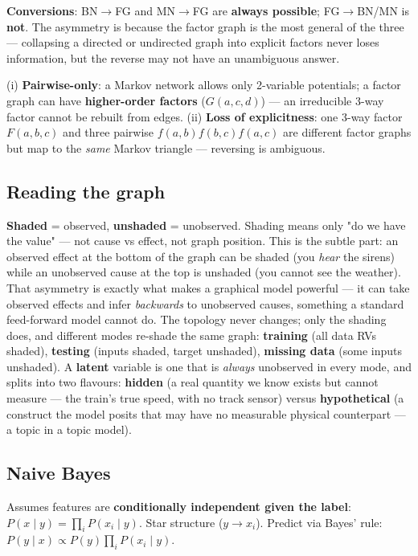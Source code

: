 \documentclass[11pt, a4paper]{article}
\newcommand{\kw}[1]{\textbf{#1}}
\begin{document}
\kw{Conversions}: BN$\to$FG and MN$\to$FG are \kw{always possible}; FG$\to$BN/MN is \kw{not}. The
asymmetry is because the factor graph is the most general of the three — collapsing a directed or
undirected graph into explicit factors never loses information, but the reverse may not have an
unambiguous answer.

\begin{trapbox}
(i) \kw{Pairwise-only}: a Markov network allows only 2-variable potentials; a factor graph can have
\kw{higher-order factors} ($G(a,c,d)$) — an irreducible 3-way factor cannot be rebuilt from edges.
(ii) \kw{Loss of explicitness}: one 3-way factor $F(a,b,c)$ and three pairwise $f(a,b)f(b,c)f(a,c)$
are different factor graphs but map to the \emph{same} Markov triangle — reversing is ambiguous.
\end{trapbox}

\subsection{Reading the graph}

\kw{Shaded} = observed, \kw{unshaded} = unobserved. Shading means only "do we have the value" — not
cause vs effect, not graph position. This is the subtle part: an observed effect at the bottom of
the graph can be shaded (you \emph{hear} the sirens) while an unobserved cause at the top is unshaded
(you cannot see the weather). That asymmetry is exactly what makes a graphical model powerful — it
can take observed effects and infer \emph{backwards} to unobserved causes, something a standard
feed-forward model cannot do. The topology never changes; only the shading does, and different modes
re-shade the same graph: \kw{training} (all data RVs shaded), \kw{testing} (inputs shaded, target
unshaded), \kw{missing data} (some inputs unshaded). A \kw{latent} variable is one that is
\emph{always} unobserved in every mode, and splits into two flavours: \kw{hidden} (a real quantity
we know exists but cannot measure — the train's true speed, with no track sensor) versus
\kw{hypothetical} (a construct the model posits that may have no measurable physical counterpart — a
topic in a topic model).

\subsection{Naive Bayes}

\begin{defbox}
Assumes features are \kw{conditionally independent given the label}:
$P(x\mid y)=\prod_i P(x_i\mid y)$. Star structure ($y\to x_i$). Predict via Bayes' rule:
$P(y\mid x)\propto P(y)\prod_i P(x_i\mid y)$.
\end{defbox}
\end{document}

